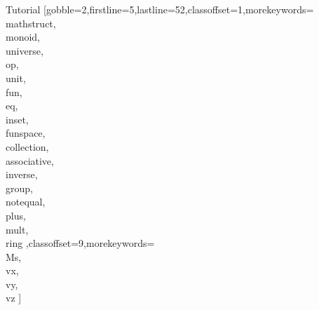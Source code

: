 \documentclass[lang={en,de}]{stex}
\begin{document}
\begin{sfragment}{Tutorial}
    [gobble=2,firstline=5,lastline=52,classoffset=1,morekeywords={
    \\mathstruct,\\monoid,\\universe,\\op,\\unit,\\fun,\\eq,\\inset,
    \\funspace,\\collection,\\associative,\\inverse,\\group,\\notequal,
    \\plus,\\mult,\\ring
    },classoffset=9,morekeywords={
      \\Ms,\\vx,\\vy,\\vz
    }]

  \ifinputref\end{sfragment}\fi
  
\end{document}
